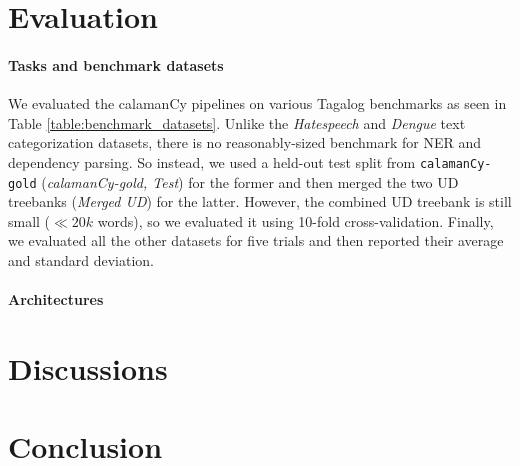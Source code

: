 \documentclass[11pt]{article}
\begin{document}
\section{Evaluation}

\paragraph*{Tasks and benchmark datasets} 
We evaluated the calamanCy pipelines on various Tagalog benchmarks as seen in Table \ref{table:benchmark_datasets}.
Unlike the \textit{Hatespeech} and \textit{Dengue} text categorization datasets, there is no reasonably-sized benchmark for NER and dependency parsing.
So instead, we used a held-out test split from \texttt{calamanCy-gold} (\textit{calamanCy-gold, Test}) for the former and then merged the two UD treebanks (\textit{Merged UD}) for the latter. 
However, the combined UD treebank is still small ($\ll 20k$ words), so we evaluated it using 10-fold cross-validation.
Finally, we evaluated all the other datasets for five trials and then reported their average and standard deviation.


\paragraph*{Architectures}



\section{Discussions}


\section{Conclusion}







\end{document}

